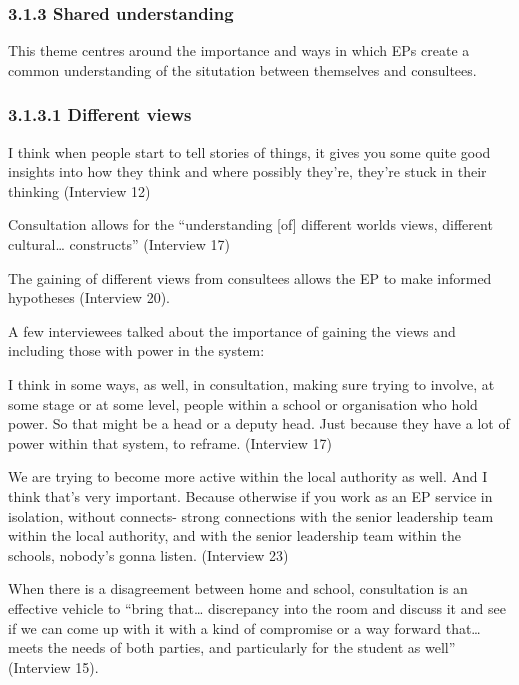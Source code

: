 \documentclass[
]{article}
\begin{document}
\hypertarget{shared-understanding}{%
\subsubsection{3.1.3 Shared understanding}\label{shared-understanding}}

This theme centres around the importance and ways in which EPs create a
common understanding of the situtation between themselves and
consultees.

\hypertarget{different-views}{%
\subsubsection{3.1.3.1 Different views}\label{different-views}}

I think when people start to tell stories of things, it gives you some
quite good insights into how they think and where possibly they're,
they're stuck in their thinking (Interview 12)

Consultation allows for the ``understanding {[}of{]} different worlds
views, different cultural\ldots{} constructs'' (Interview 17)

The gaining of different views from consultees allows the EP to make
informed hypotheses (Interview 20).

A few interviewees talked about the importance of gaining the views and
including those with power in the system:

I think in some ways, as well, in consultation, making sure trying to
involve, at some stage or at some level, people within a school or
organisation who hold power. So that might be a head or a deputy head.
Just because they have a lot of power within that system, to reframe.
(Interview 17)

We are trying to become more active within the local authority as well.
And I think that's very important. Because otherwise if you work as an
EP service in isolation, without connects- strong connections with the
senior leadership team within the local authority, and with the senior
leadership team within the schools, nobody's gonna listen. (Interview
23)

When there is a disagreement between home and school, consultation is an
effective vehicle to ``bring that\ldots{} discrepancy into the room and
discuss it and see if we can come up with it with a kind of compromise
or a way forward that\ldots{} meets the needs of both parties, and
particularly for the student as well'' (Interview 15).
\end{document}

